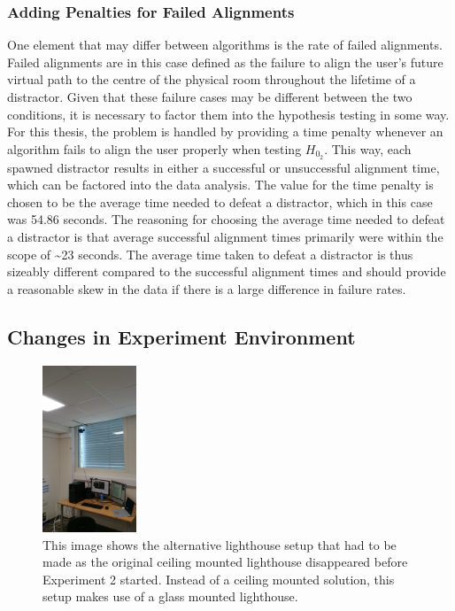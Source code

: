 \subsubsection{Adding Penalties for Failed Alignments}
One element that may differ between algorithms is the rate of failed alignments. Failed alignments are in this case defined as the failure to align the user's future virtual path to the centre of the physical room throughout the lifetime of a distractor. Given that these failure cases may be different between the two conditions, it is necessary to factor them into the hypothesis testing in some way. For this thesis, the problem is handled by providing a time penalty whenever an algorithm fails to align the user properly when testing $H_{0_2}$. This way, each spawned distractor results in either a successful or unsuccessful alignment time, which can be factored into the data analysis. The value for the time penalty is chosen to be the average time needed to defeat a distractor, which in this case was 54.86 seconds. The reasoning for choosing the average time needed to defeat a distractor is that average successful alignment times primarily were within the scope of \textasciitilde23 seconds. The average time taken to defeat a distractor is thus sizeably different compared to the successful alignment times and should provide a reasonable skew in the data if there is a large difference in failure rates. 


\subsection{Changes in Experiment Environment}\label{sec:ex2environmentchanges}
\begin{figure}[tbph]
    \centering
    \includegraphics[width=0.25\textwidth]{figures/images/experiment2EnvironmentChanges.jpg}
    \caption[Changes in Experiment Environment for Experiment 2]{This image shows the alternative lighthouse setup that had to be made as the original ceiling mounted lighthouse disappeared before Experiment 2 started. Instead of a ceiling mounted solution, this setup makes use of a glass mounted lighthouse.}
    \label{fig:ex2changedLighthouse}
\end{figure}

